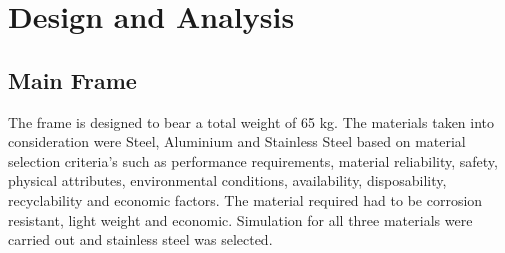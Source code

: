 \chapter{Design and Analysis} \label{Design and Analysis}
\section{Main Frame} \label{Main Frame 1}
The frame is designed to bear a total weight of 65 kg. The materials taken into consideration were Steel, Aluminium and Stainless Steel based on material selection criteria’s such as performance requirements, material reliability, safety, physical attributes, environmental conditions, availability, disposability, recyclability and economic factors.
The material required had to be corrosion resistant, light weight and economic.
Simulation for all three materials were carried out and stainless steel was selected.
\begin{table}[!ht]
\caption{Stress and Displacement Analysis of Main Frame}
\end{table}





